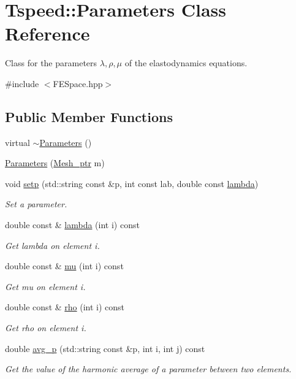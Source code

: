 \hypertarget{classTspeed_1_1Parameters}{\section{Tspeed\-:\-:Parameters Class Reference}
\label{classTspeed_1_1Parameters}
}


Class for the parameters $\lambda, \rho, \mu$ of the elastodynamics equations.  




{\ttfamily \#include $<$F\-E\-Space.\-hpp$>$}

\subsection*{Public Member Functions}
\begin{DoxyCompactItemize}
\item 
virtual \hyperlink{classTspeed_1_1Parameters_ad15fb30d29239fb9d5f6ae2d95448e0b}{$\sim$\-Parameters} ()
\item 
\hyperlink{classTspeed_1_1Parameters_a9532e35c18436a3ffa9df32e5124b8cf}{Parameters} (\hyperlink{namespaceTspeed_a7367a01365c4cc2c1a09305b3effc4e8}{Mesh\-\_\-ptr} m)
\item 
void \hyperlink{classTspeed_1_1Parameters_a3f92e66ca503e376f51cdceebdc1afaa}{setp} (std\-::string const \&p, int const lab, double const \hyperlink{classTspeed_1_1Parameters_aec8ee931eddac3812e09db45a412685d}{lambda})
\begin{DoxyCompactList}\small\item\em Set a parameter. \end{DoxyCompactList}\item 
double const \& \hyperlink{classTspeed_1_1Parameters_aec8ee931eddac3812e09db45a412685d}{lambda} (int i) const 
\begin{DoxyCompactList}\small\item\em Get lambda on element i. \end{DoxyCompactList}\item 
double const \& \hyperlink{classTspeed_1_1Parameters_a4edca911ff34296039e07b9665ebcfa1}{mu} (int i) const 
\begin{DoxyCompactList}\small\item\em Get mu on element i. \end{DoxyCompactList}\item 
double const \& \hyperlink{classTspeed_1_1Parameters_ad111ae3220d2ff1c68130d9dee83665e}{rho} (int i) const 
\begin{DoxyCompactList}\small\item\em Get rho on element i. \end{DoxyCompactList}\item 
double \hyperlink{classTspeed_1_1Parameters_a9e3e70a0fd2c8aae9af142069c744cbb}{avg\-\_\-p} (std\-::string const \&p, int i, int j) const 
\begin{DoxyCompactList}\small\item\em Get the value of the harmonic average of a parameter between two elements. \end{DoxyCompactList}\end{DoxyCompactItemize}


